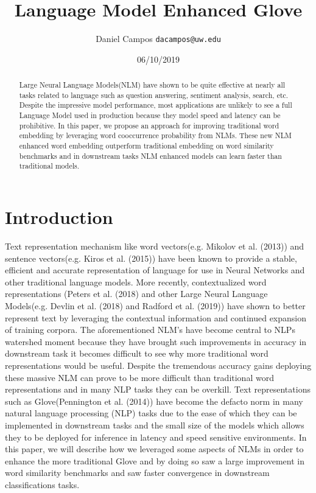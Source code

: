 \documentclass[11pt]{article}
\begin{document}
\twocolumn 
\title{Language Model Enhanced Glove}
\author{Daniel Campos  \tt {dacampos@uw.edu}}
\date{06/10/2019}
\maketitle 
\begin{abstract}
Large Neural Language Models(NLM) have shown to be quite effective at nearly all tasks related to language such as question answering, sentiment analysis, search, etc.
Despite the impressive model performance, most applications are unlikely to see a full Language Model used in production because they model speed and latency can be prohibitive.
In this paper, we propose an approach for improving traditional word embedding by leveraging word cooccurrence probability from NLMs. These new NLM enhanced word embedding outperform traditional embedding on word similarity benchmarks and in downstream tasks NLM enhanced models can learn faster than traditional models.
\end{abstract}
\section{Introduction}
Text representation mechanism like word vectors(e.g. Mikolov et al. (2013)) and sentence vectors(e.g. Kiros et al. (2015)) have been known to provide a stable, efficient and accurate representation of language for use in Neural Networks and other traditional language models. More recently, contextualized word representations (Peters et al. (2018) and other Large Neural Language Models(e.g. Devlin et al. (2018) and Radford et al. (2019)) have shown to better represent text by leveraging the contextual information and continued expansion of training corpora. 
The aforementioned NLM's have become central to NLPs watershed moment because they have brought such improvements in accuracy in downstream task it becomes difficult to see why more traditional word representations would be useful. Despite the tremendous accuracy gains deploying these massive NLM can prove to be more difficult than traditional word representations and in many NLP tasks they can be overkill. 
Text representations such as Glove(Pennington et al. (2014)) have become the defacto norm in many natural language processing (NLP) tasks due to the ease of which they can be implemented in downstream tasks and the small size of the models which allows they to be deployed for inference in latency and speed sensitive environments. 
In this paper, we will describe how we leveraged some aspects of NLMs in order to enhance the more traditional Glove and by doing so saw a large improvement in word similarity benchmarks and saw faster convergence in downstream classifications tasks.
\end{document}
